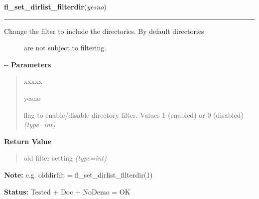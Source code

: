     \vspace{0.5ex}

\hspace{.8\funcindent}\begin{boxedminipage}{\funcwidth}

    \raggedright \textbf{fl\_set\_dirlist\_filterdir}(\textit{yesno})

    \vspace{-1.5ex}

    \rule{\textwidth}{0.5\fboxrule}
\setlength{\parskip}{2ex}
%
\begin{description}
\item[{Change the filter to include the directories. By default directories}] \leavevmode 
are not subject to filtering.

\end{description}

-{}-
\setlength{\parskip}{1ex}
      \textbf{Parameters}
      \vspace{-1ex}

      \begin{quote}
        \begin{Ventry}{xxxxx}

          \item[yesno]


flag to enable/disable directory filter. Values 1 (enabled) or 0
(disabled)
            {\it (type=int)}

        \end{Ventry}

      \end{quote}

      \textbf{Return Value}
    \vspace{-1ex}

      \begin{quote}

old filter setting
      {\it (type=int)}

      \end{quote}

\textbf{Note:} 
e.g. olddirfilt = fl\_set\_dirlist\_filterdir(1)


\textbf{Status:} 
Tested + Doc + NoDemo = OK


    \end{boxedminipage}

    \label{xformslib:flfilesys:fl_free_dirlist}

